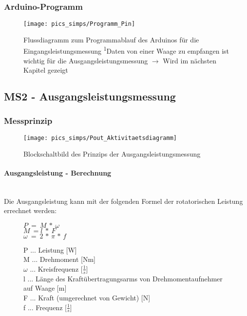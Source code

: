 \documentclass[12pt,a4paper]{article}
\begin{document}
\subsubsection{Arduino-Programm}
\begin{figure}[h!]
	\centering
	\texttt{[image: pics\_simps/Programm\_Pin]}
	\caption{Flussdiagramm zum Programmablauf des Arduinos für die Eingangsleistungsmessung\vspace{0.3cm}\newline
	\textsuperscript{1}Daten von einer Waage zu empfangen ist wichtig für die Ausgangsleistungsmessung $\rightarrow$ Wird im nächsten Kapitel gezeigt}
\end{figure}
%
%
\newpage
\subsection{MS2 - Ausgangsleistungsmessung}
\subsubsection{Messprinzip}
\begin{figure}[h!]
	\centering
	\texttt{[image: pics\_simps/Pout\_Aktivitaetsdiagramm]}
	\caption{Blockschaltbild des Prinzips der Ausgangsleistungsmessung}
\end{figure}
%
\newpage
\paragraph{Ausgangsleistung - Berechnung}\mbox{}\\
Die Ausgangsleistung kann mit der folgenden Formel der rotatorischen Leistung errechnet werden:\\
\begin{figure}[h!]
	\centering
	\huge$P\:=\:M\:*\:\omega$\vspace{0.5cm}\\
	\Large$M\:=l\:*\:F$\\
	\Large$\omega\:=\:2\,*\,\pi\,*\,f$\vspace{0.5cm}\\
	\raggedright
	\large P ... Leistung [W]\\
	\large M ... Drehmoment [Nm]\\
	\large $\omega$ ... Kreisfrequenz [$\frac{1}{s}$]\\
	\large l ... Länge des Kraftübertragungsarms von Drehmomentaufnehmer auf Waage [m]\\
	\large F ... Kraft (umgerechnet von Gewicht) [N]\\
	\large f ... Frequenz [$\frac{1}{s}$]
\end{figure}
%
\newpage
\end{document}
